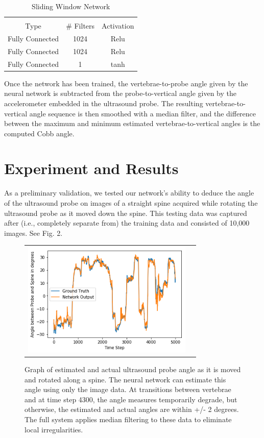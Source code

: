 \documentclass{article}
\begin{document}
\begin{table}[ht]
\caption{Sliding Window Network}
\begin{tabular}{c c c}
\hline \\
Type & \# Filters & Activation \\
\hline
Fully Connected & 1024  & Relu \\
Fully Connected & 1024  & Relu \\
Fully Connected & 1 &  tanh \\
\end{tabular}
\end{table}

Once the network has been trained, the vertebrae-to-probe angle given by the neural network is subtracted from the probe-to-vertical angle given by the accelerometer embedded in the ultrasound probe. The resulting vertebrae-to-vertical angle sequence is then smoothed with a median filter, and the difference between the maximum and minimum estimated vertebrae-to-vertical angles is the computed Cobb angle.   

\section{Experiment and Results}

As a preliminary validation, we tested our network’s ability to deduce the angle of the ultrasound probe on images of a straight spine acquired while rotating the ultrasound probe as it moved down the spine.  This testing data was captured after (i.e., completely separate from) the training data and consisted of 10,000 images.  See Fig. 2.

\begin{figure}
\centering
\begin{tabular}{cc}
\centering
\includegraphics[height=5.5cm,keepaspectratio]{NetworkOutput}
\end{tabular}
\caption{Graph of estimated and actual ultrasound probe angle as it is moved and rotated along a spine.  The neural network can estimate this angle using only the image data.  At transitions between vertebrae and at time step 4300, the angle measures temporarily degrade, but otherwise, the estimated and actual angles are within +/- 2 degrees.  The full system applies median filtering to these data to eliminate local irregularities.
}
\end{figure}
 
\end{document}
